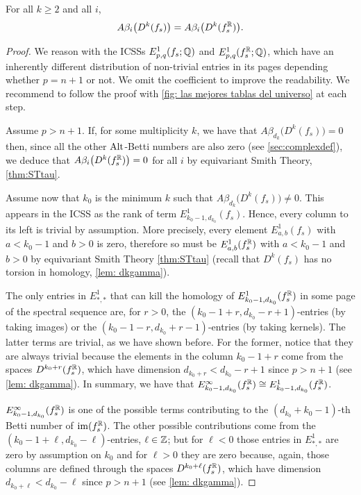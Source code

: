 \documentclass[a4paper,12pt]{amsart}
\begin{document}
\begin{theorem}\label{prop:draftXIII}
For all $k\geq2$ and all $i$,
\[A\beta_i\big(D^k(f_s)\big)=A\beta_i\big(D^k(f_s^{\mathbb{R}})\big).\]
\end{theorem}
\begin{proof}
We reason with the ICSSs $E^1_{p,q}(f_s;\mathbb{Q})$ and $E^1_{p,q}(f^{\mathbb{R}}_s;\mathbb{Q})$, which have an inherently different distribution of non-trivial entries in its pages depending whether $p=n+1$ or not. We omit the coefficient to improve the readability. We recommend to follow the proof with \cref{fig: las mejores tablas del universo} at each step.
\newline

Assume $p> n+1$.
If, for some multiplicity $k$, we have that $A\beta_{d_k}\big(D^k(f_s)\big)=0$ then, since all the other $\textnormal{Alt}$-Betti numbers are also zero (see \cref{sec:complexdef}), we deduce that 
$A\beta_i\big(D^k(f_s^{\mathbb{R}})\big)=0$
for all $i$ by equivariant Smith Theory, \cref{thm:STtau}. 

Assume now that $k_0$ is the minimum $k$ such that $A\beta_{d_k}\big(D^k(f_s)\big)\neq0$. This appears in the ICSS as the rank of term $E^1_{k_0-1,d_{k_0}}(f_s)$. Hence, every column to its left is trivial by assumption. More precisely, every element $E^1_{a,b}(f_s)$ with $a<k_0-1$ and $b>0$ is zero, therefore so must be $E^1_{a,b}(f_s^{\mathbb{R}})$ with $a<k_0-1$ and $b>0$ by equivariant Smith Theory \cref{thm:STtau} (recall that $D^k(f_s)$ has no torsion in homology, \cref{lem: dkgamma}).


The only entries in $E^1_{*,*}$ that can kill the homology of $E^1_{k_0-1,d_{k_0}}(f_s^{\mathbb{R}})$ in some page of the spectral sequence are, for $r>0$, the $(k_0-1+r,d_{k_0}-r+1)$-entries (by taking images) or the $(k_0-1-r,d_{k_0}+r-1)$-entries (by taking kernels). The latter terms are trivial, as we have shown before. For the former, notice that they are always trivial because the elements in the column $k_0-1+r$ come from the spaces $D^{k_0+r}(f_s^{\mathbb{R}})$, which have dimension $d_{k_0+r}<d_{k_0}-r+1$ since $p>n+1$ (see \cref{lem: dkgamma}). In summary, we have that $E^\infty_{k_0-1,d_{k_0}}(f_s^{\mathbb{R}})\cong E^1_{k_0-1,d_{k_0}}(f_s^{\mathbb{R}})$. 

$E^\infty_{k_0-1,d_{k_0}}(f_s^{\mathbb{R}})$ is one of the possible terms contributing to the $(d_{k_0}+k_0-1)$-th Betti number of $\operatorname{im}(f_s^{\mathbb{R}})$. The other possible contributions come from the $(k_0-1+\ell,d_{k_0}-\ell)$-entries, $\ell\in\mathbb{Z}$; but for $\ell<0$ those entries in $E^1_{*,*}$ are zero by assumption on $k_0$ and for $\ell>0$ they are zero because, again, those columns are defined through the spaces $D^{k_0+\ell}(f_s^{\mathbb{R}})$, which have dimension $d_{k_0+\ell}<d_{k_0}-\ell$ since $p>n+1$ (see \cref{lem: dkgamma}).


\end{proof}
\end{document}
